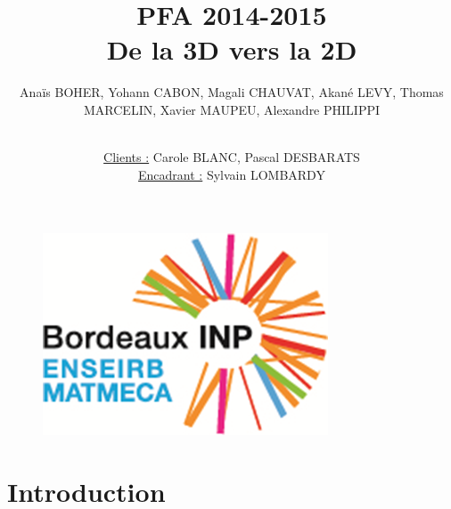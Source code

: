\documentclass{beamer}
\title[PFA 2014-2015]{PFA 2014-2015 \\ \LARGE De la 3D vers la 2D} %
\author{Anaïs BOHER, Yohann CABON, Magali CHAUVAT, Akané LEVY, Thomas MARCELIN, Xavier MAUPEU, Alexandre PHILIPPI
\\ \and \\
\underline{Clients :} Carole BLANC, Pascal DESBARATS 
\\
\underline{Encadrant :} Sylvain LOMBARDY}
\institute[Enseirb-Matmeca] %
{École Nationale Supérieure d'Électronique, Informatique, Télécommunications, Mathématiques et Mécanique de Bordeaux
}
\date{} %
\begin{document}
\graphicspath{{./images/}{.}}





\begin{frame}
\titlepage %

\begin{figure}[B]
\vspace*{-1cm}
\includegraphics[scale=0.4]{logo.png}
\end{figure}
\end{frame}



\section{Introduction}
\end{document}
